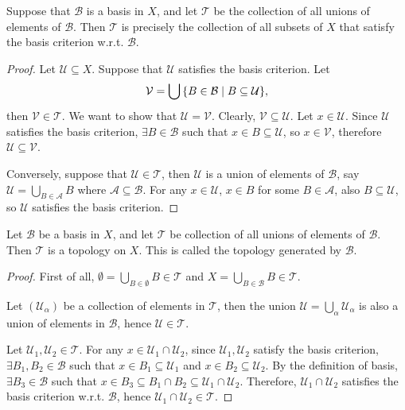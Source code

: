 \begin{lm}
    Suppose that $\mathcal B$ is a basis in $X$, and let $\mathcal T$ be the collection of all unions of elements of $\mathcal B$. Then $\mathcal T$ is precisely the collection of all subsets of $X$ that satisfy the basis criterion w.r.t. $\mathcal B$.
    \begin{proof}
        Let $\mathcal U\subseteq X$. Suppose that $\mathcal U$ satisfies the basis criterion. Let
        \[
        \mathcal V = \bigcup{\left\{{B\in\mathcal B\mid B\subseteq\mathcal U}\right\}},
        \]
        then $\mathcal V \in \mathcal T$. We want to show that $\mathcal U = \mathcal V$. Clearly, $\mathcal V\subseteq \mathcal U$. Let $x\in \mathcal U$. Since $\mathcal U$ satisfies the basis criterion, $\exists B\in\mathcal B$ such that $x\in B\subseteq \mathcal U$, so $x\in \mathcal V$, therefore $\mathcal U\subseteq \mathcal V$.

        Conversely, suppose that $\mathcal U\in \mathcal T$, then $\mathcal U$ is a union of elements of $\mathcal B$, say $\mathcal U = \bigcup_{B\in\mathcal A}B$ where $\mathcal A\subseteq \mathcal B$. For any $x\in\mathcal U$, $x\in B$ for some $B\in \mathcal A$, also $B\subseteq \mathcal U$, so $\mathcal U$ satisfies the basis criterion.
    \end{proof}
\end{lm}

\begin{prop}
    Let $\mathcal B$ be a basis in $X$, and let $\mathcal T$ be collection of all unions of elements of $\mathcal B$. Then $\mathcal T$ is a topology on $X$. This is called the topology generated by $\mathcal B$.
    \begin{proof}
        First of all, $\emptyset = \bigcup_{B\in\emptyset} B \in \mathcal T$ and $X = \bigcup_{B\in\mathcal B} B \in \mathcal T$.

        Let $(\mathcal U_\alpha)$ be a collection of elements in $\mathcal T$, then the union $\mathcal U = \bigcup_\alpha \mathcal U_\alpha$ is also a union of elements in $\mathcal B$, hence $\mathcal U\in \mathcal T$.

        Let $\mathcal U_1, \mathcal U_2 \in \mathcal T$. For any $x\in \mathcal U_1 \cap \mathcal U_2$, since $\mathcal U_1, \mathcal U_2$ satisfy the basis criterion, $\exists B_1, B_2 \in \mathcal B$ such that $x\in B_1\subseteq \mathcal U_1$ and $x\in B_2\subseteq \mathcal U_2$. By the definition of basis, $\exists B_3\in \mathcal B$ such that $x\in B_3 \subseteq B_1\cap B_2 \subseteq \mathcal U_1 \cap \mathcal U_2$. Therefore, $\mathcal U_1 \cap \mathcal U_2$ satisfies the basis criterion w.r.t. $\mathcal B$, hence $\mathcal U_1 \cap \mathcal U_2 \in \mathcal T$.
    \end{proof}
\end{prop}

